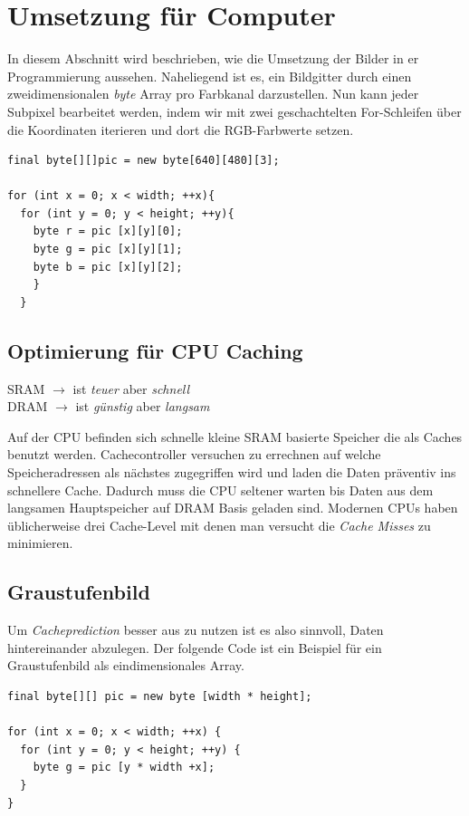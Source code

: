 \section{Umsetzung für Computer}
In diesem Abschnitt wird beschrieben, wie die Umsetzung der Bilder in er Programmierung aussehen.
Naheliegend ist es, ein Bildgitter durch einen zweidimensionalen \textit{byte} Array pro Farbkanal darzustellen.
Nun kann jeder Subpixel bearbeitet werden, indem wir mit zwei geschachtelten For-Schleifen über die Koordinaten iterieren und dort die RGB-Farbwerte setzen.
\begin{lstlisting}[caption=Bildgitter aus zweidimensionalen Byte Array pro Farbkanal]
final byte[][]pic = new byte[640][480][3];

for (int x = 0; x < width; ++x){
  for (int y = 0; y < height; ++y){
    byte r = pic [x][y][0];
    byte g = pic [x][y][1];
    byte b = pic [x][y][2];
    }
  }
\end{lstlisting}

\subsection{Optimierung für CPU Caching}

SRAM $\rightarrow$ ist \textit{teuer} aber \textit{schnell} \\
DRAM $\rightarrow$ ist \textit{günstig} aber \textit{langsam}

Auf der CPU befinden sich schnelle kleine SRAM basierte Speicher die als Caches benutzt werden. Cachecontroller versuchen zu errechnen auf welche Speicheradressen als nächstes zugegriffen wird und laden die Daten präventiv ins schnellere Cache. Dadurch muss die CPU seltener warten bis Daten aus dem langsamen Hauptspeicher auf DRAM Basis geladen sind.
Modernen CPUs haben üblicherweise drei Cache-Level mit denen man versucht die \textit{Cache Misses} zu minimieren.

\cite{drepper2007every}

\subsection{Graustufenbild}
Um \textit{Cacheprediction} besser aus zu nutzen ist es also sinnvoll, Daten hintereinander abzulegen. Der folgende Code ist ein Beispiel für ein Graustufenbild als eindimensionales Array.

\begin{lstlisting}[caption=Graustufenbild]
final byte[][] pic = new byte [width * height];

for (int x = 0; x < width; ++x) {
  for (int y = 0; y < height; ++y) {
    byte g = pic [y * width +x];
  }
}
\end{lstlisting}


